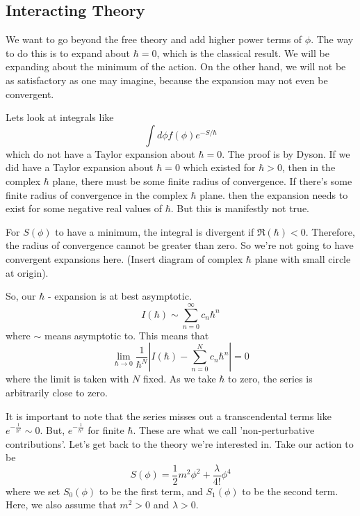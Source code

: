 \documentclass[11pt, oneside]{article}   	%
\theoremstyle{slanted}
\begin{document}
\subsection{Interacting Theory}
We want to go beyond 
the free theory and add higher power terms 
of $ \phi $. The way 
to do this is 
to expand about $ \hbar  =0 $, which is the classical 
result. 
We will be expanding about the minimum of the action. 
On the other hand, we will not 
be as satisfactory as one may imagine, 
because the expansion may not even be convergent. 

Lets look at integrals like 
\[
\int d \phi f \left( \phi  \right)  e ^{  - S / \hbar}
\] which do not have a Taylor expansion 
about $ \hbar   = 0 $. 
The proof is by Dyson. 
If we did have a Taylor expansion about $ \hbar  =  0 $ which 
existed for $ \hbar > 0 $,
then in the complex $ \hbar $ plane, there must be  
some finite radius of convergence. 
If there's some finite radius of convergence in 
the complex $ \hbar $ plane. 
then the expansion needs to exist 
for some negative real values of $ \hbar $. 
But this is manifestly not true. 

For $ S ( \phi  )$ to have a minimum, the integral 
is divergent if  $ \Re\left( \hbar  \right)  < 0 $. 
Therefore, the radius of convergence 
cannot be greater than zero. 
So we're not going to have convergent expansions 
here. 
(Insert diagram of complex $ \hbar$ plane with small circle 
at origin). 

So, our $ \hbar $  - expansion is at best asymptotic. 
\[
I \left( \hbar  \right)  \sim \sum_{ n = 0 } ^{ \infty } c _ n \hbar ^  n 
\] where $ \sim $ means asymptotic to. 
This means that 
\[
\lim _{ \hbar \to 0 } \frac{1}{ \hbar^ N  } | I \left( \hbar  \right)  
 - \sum_{ n = 0 } ^ N c _ n \hbar ^ n | = 0 
\]  where the limit is taken with $ N $ fixed. 
As we take $ \hbar$ to zero, the series
is arbitrarily close to zero. 

It is important to note that 
the series misses out a transcendental terms 
like $ e^{  - \frac{1}{\hbar ^ 2 } } \sim 0  $. 
But, $ e ^{  - \frac{1}{\hbar ^ 2 } } $ for finite $ \hbar$. 
These are what we call 'non-perturbative contributions'. 
Let's get 
back to the theory we're interested in. 
Take our action to be 
\[
S \left( \phi  \right)   = \frac{1}{2 } m ^ 2 \phi ^ 2 + \frac{\lambda }{ 4 ! } \phi ^ 4 
\] where we set $ S_ 0 \left( \phi  \right)  $ to be the first term, 
and $ S _ 1 \left( \phi  \right)  $ to be the second term. 
Here, we also assume that $ m ^ 2 > 0 $ and $ \lambda > 0 $. 
\end{document}
